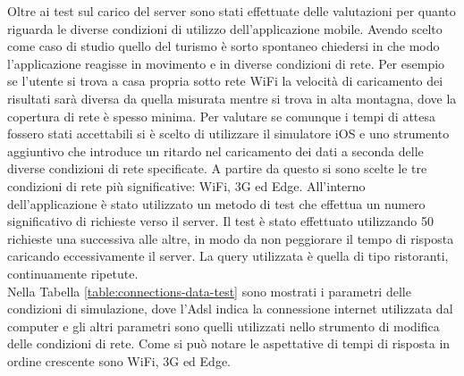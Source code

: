 Oltre ai test sul carico del server sono stati effettuate delle valutazioni per quanto riguarda le diverse condizioni di utilizzo dell'applicazione mobile. Avendo scelto come caso di studio quello del turismo è sorto spontaneo chiedersi in che modo l'applicazione reagisse in movimento e in diverse condizioni di rete. Per esempio se l'utente si trova a casa propria sotto rete WiFi la velocità di caricamento dei risultati sarà diversa da quella misurata mentre si trova in alta montagna, dove la copertura di rete è spesso minima. Per valutare se comunque i tempi di attesa fossero stati accettabili si è scelto di utilizzare il simulatore iOS e uno strumento aggiuntivo che introduce un ritardo nel caricamento dei dati a seconda delle diverse condizioni di rete specificate. A partire da questo si sono scelte le tre condizioni di rete più significative: WiFi, 3G ed Edge.
All'interno dell'applicazione è stato utilizzato un metodo di test che effettua un numero significativo di richieste verso il server. Il test è stato effettuato utilizzando 50 richieste una successiva alle altre, in modo da non peggiorare il tempo di risposta caricando eccessivamente il server. La query utilizzata è quella di tipo ristoranti, continuamente ripetute. \\
Nella Tabella \ref{table:connections-data-test} sono mostrati i parametri delle condizioni di simulazione, dove l'Adsl indica la connessione internet utilizzata dal computer e gli altri parametri sono quelli utilizzati nello strumento di modifica delle condizioni di rete. Come si può notare le aspettative di tempi di risposta in ordine crescente sono WiFi, 3G ed Edge.

\begin{table}[ht]
	\caption{Dati connessione Test tempi risposta a condizioni di rete diverse}
	\label{table:connections-data-test}
	\noindent{}
\end{table}


